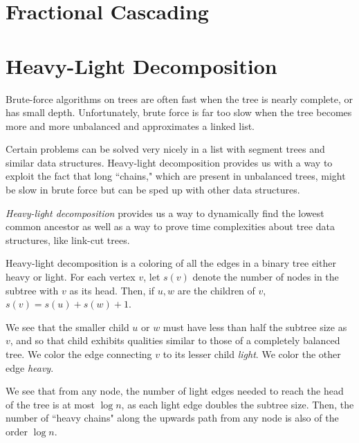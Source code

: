 \documentclass[11pt]{book}
\begin{document}
\section{Fractional Cascading}

\section{Heavy-Light Decomposition}

Brute-force algorithms on trees are often fast when the tree is nearly complete, or has small depth. Unfortunately, brute force is far too slow when the tree becomes more and more unbalanced and approximates a linked list.

Certain problems can be solved very nicely in a list with segment trees and similar data structures. Heavy-light decomposition provides us with a way to exploit the fact that long ``chains," which are present in unbalanced trees, might be slow in brute force but can be sped up with other data structures.

\textit{Heavy-light decomposition} provides us a way to dynamically find the lowest common ancestor as well as a way to prove time complexities about tree data structures, like link-cut trees. 

Heavy-light decomposition is a coloring of all the edges in a binary tree either heavy or light. For each vertex $v$, let $s(v)$ denote the number of nodes in the subtree with $v$ as its head. Then, if $u,w$ are the children of $v$, $s(v)=s(u)+s(w)+1$.

We see that the smaller child $u$ or $w$ must have less than half the subtree size as $v$, and so that child exhibits qualities similar to those of a completely balanced tree. We color the edge connecting $v$ to its lesser child \textit{light}. We color the other edge \textit{heavy}.

We see that from any node, the number of light edges needed to reach the head of the tree is at most $\log{n}$, as each light edge doubles the subtree size. Then, the number of ``heavy chains" along the upwards path from any node is also of the order $\log{n}$.
\end{document}
